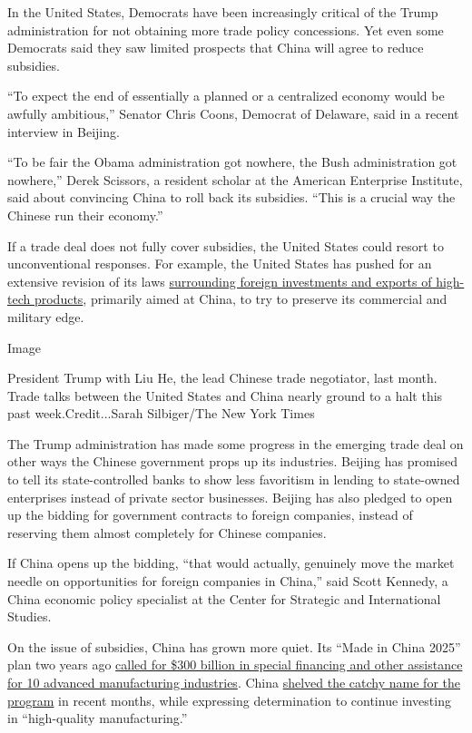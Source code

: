 In the United States, Democrats have been increasingly critical of the
Trump administration for not obtaining more trade policy concessions.
Yet even some Democrats said they saw limited prospects that China will
agree to reduce subsidies.

``To expect the end of essentially a planned or a centralized economy
would be awfully ambitious,'' Senator Chris Coons, Democrat of Delaware,
said in a recent interview in Beijing.

``To be fair the Obama administration got nowhere, the Bush
administration got nowhere,'' Derek Scissors, a resident scholar at the
American Enterprise Institute, said about convincing China to roll back
its subsidies. ``This is a crucial way the Chinese run their economy.''

If a trade deal does not fully cover subsidies, the United States could
resort to unconventional responses. For example, the United States has
pushed for an extensive revision of its laws
\href{https://www.nytimes.com/2018/10/10/business/us-china-investment-cfius.html}{surrounding
foreign investments and exports of high-tech products}, primarily aimed
at China, to try to preserve its commercial and military edge.

Image

President Trump with Liu He, the lead Chinese trade negotiator, last
month. Trade talks between the United States and China nearly ground to
a halt this past week.Credit...Sarah Silbiger/The New York Times

The Trump administration has made some progress in the emerging trade
deal on other ways the Chinese government props up its industries.
Beijing has promised to tell its state-controlled banks to show less
favoritism in lending to state-owned enterprises instead of private
sector businesses. Beijing has also pledged to open up the bidding for
government contracts to foreign companies, instead of reserving them
almost completely for Chinese companies.

If China opens up the bidding, ``that would actually, genuinely move the
market needle on opportunities for foreign companies in China,'' said
Scott Kennedy, a China economic policy specialist at the Center for
Strategic and International Studies.

On the issue of subsidies, China has grown more quiet. Its ``Made in
China 2025'' plan two years ago
\href{https://www.nytimes.com/2017/03/07/business/china-trade-manufacturing-europe.html}{called
for \$300 billion in special financing and other assistance for 10
advanced manufacturing industries}. China
\href{https://www.nytimes.com/2018/12/12/business/china-trade-war.html}{shelved
the catchy name for the program} in recent months, while expressing
determination to continue investing in ``high-quality manufacturing.''


